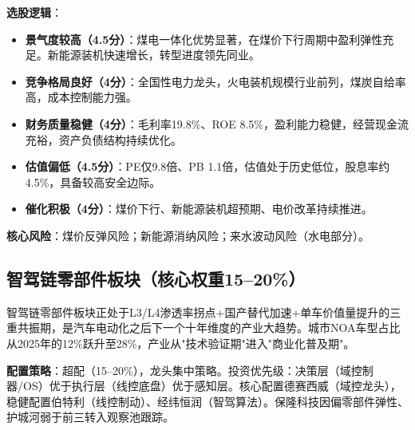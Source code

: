 \textbf{选股逻辑}：
\vspace{0.2em}
\begin{itemize}[leftmargin=2em]
\item \textbf{景气度较高（4.5分）}：煤电一体化优势显著，在煤价下行周期中盈利弹性充足。新能源装机快速增长，转型进度领先同业。
\item \textbf{竞争格局良好（4分）}：全国性电力龙头，火电装机规模行业前列，煤炭自给率高，成本控制能力强。
\item \textbf{财务质量稳健（4分）}：毛利率19.8\%、ROE 8.5\%，盈利能力稳健，经营现金流充裕，资产负债结构持续优化。
\item \textbf{估值偏低（4.5分）}：PE仅9.8倍、PB 1.1倍，估值处于历史低位，股息率约4.5\%，具备较高安全边际。
\item \textbf{催化积极（4分）}：煤价下行、新能源装机超预期、电价改革持续推进。
\end{itemize}

\textbf{核心风险}：煤价反弹风险；新能源消纳风险；来水波动风险（水电部分）。

\subsection{智驾链零部件板块（核心权重15--20\%）}

智驾链零部件板块正处于L3/L4渗透率拐点+国产替代加速+单车价值量提升的三重共振期，是汽车电动化之后下一个十年维度的产业大趋势。城市NOA车型占比从2025年的12\%跃升至28\%，产业从"技术验证期"进入"商业化普及期"。

\textbf{配置策略}：超配（15--20\%），龙头集中策略。投资优先级：决策层（域控制器/OS）优于执行层（线控底盘）优于感知层。核心配置德赛西威（域控龙头），稳健配置伯特利（线控制动）、经纬恒润（智驾算法）。保隆科技因偏零部件弹性、护城河弱于前三转入观察池跟踪。

